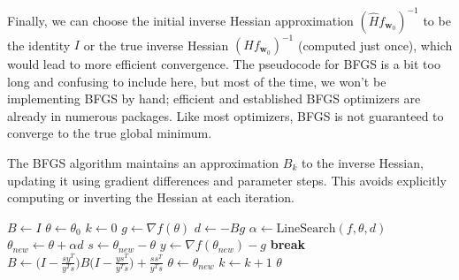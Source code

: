   Finally, we can choose the initial inverse Hessian approximation $(\hat{H} f_{\mathbf{w}_{0}})^{-1}$ to be the identity $I$ or the true inverse Hessian $(H f_{\mathbf{w}_{0}})^{-1}$ (computed just once), which would lead to more efficient convergence. The pseudocode for BFGS is a bit too long and confusing to include here, but most of the time, we won't be implementing BFGS by hand; efficient and established BFGS optimizers are already in numerous packages. Like most optimizers, BFGS is not guaranteed to converge to the true global minimum. 

  \begin{algo}[BFGS]
    The BFGS algorithm maintains an approximation $B_k$ to the inverse Hessian, updating it using gradient differences and parameter steps. This avoids explicitly computing or inverting the Hessian at each iteration. 
    \begin{algorithm}[H]
    \label{alg:bfgs}
    \begin{algorithmic}[1]

        \State $B \gets I$ 
        \State $\theta \gets \theta_0$
        \State $k \gets 0$
          \State $g \gets \nabla f(\theta)$
          \State $d \gets -B g$
          \State $\alpha \gets \text{LineSearch}(f, \theta, d)$ 
          \State $\theta_{new} \gets \theta + \alpha d$
          \State $s \gets \theta_{new} - \theta$
          \State $y \gets \nabla f(\theta_{new}) - g$
            \State \textbf{break} 
          \EndIf
          \State $B \gets \Big(I - \frac{s y^T}{y^T s}\Big) B \Big(I - \frac{y s^T}{y^T s}\Big) + \frac{s s^T}{y^T s}$
          \State $\theta \gets \theta_{new}$
          \State $k \gets k + 1$
        \EndWhile
        \State \Return $\theta$
      \EndProcedure
    \end{algorithmic}
    \end{algorithm}
  \end{algo}

